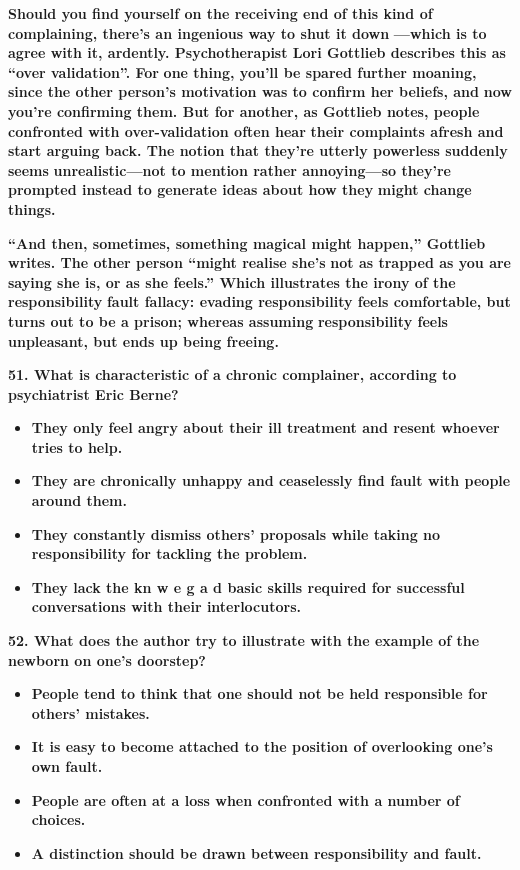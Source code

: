 \documentclass[UTF8,11pt]{ctexart}
\begin{document}
\textbf{Should you find yourself on the receiving end of this kind of complaining, there’s an ingenious way to shut it down} \textbf{—which is to agree with it, ardently. Psychotherapist Lori Gottlieb describes this as “over validation”. For} \textbf{one thing, you’ll be spared further moaning, since the other person’s motivation was to confirm her beliefs, and} \textbf{now you’re confirming them. But for another, as Gottlieb notes, people confronted with over-validation often hear} \textbf{their complaints afresh and start arguing back. The notion that they’re utterly powerless suddenly seems} \textbf{unrealistic—not to mention rather annoying—so they’re prompted instead to generate ideas about how they} \textbf{might change things.}


\textbf{“And then, sometimes, something magical might happen,” Gottlieb writes. The other person “might realise she’s} \textbf{not as trapped as you are saying she is, or as she feels.” Which illustrates the irony of the responsibility} \textbf{fault fallacy: evading responsibility feels comfortable, but turns out to be a prison; whereas assuming} \textbf{responsibility feels unpleasant, but ends up being freeing.}


\textbf{51. What is characteristic of a chronic complainer, according to psychiatrist Eric Berne?}


\begin{itemize}[leftmargin=2em,itemsep=.2em,topsep=.4em]\item[A.] \textbf{They only feel angry about their ill treatment and resent whoever tries to help.}
\item[B.] \textbf{They are chronically unhappy and ceaselessly find fault with people around them.}
\item[C.] \textbf{They constantly dismiss others’ proposals while taking no responsibility for tackling the problem.}
\item[D.] \textbf{They lack the kn w e g a d basic skills required for successful conversations with their interlocutors.}
\end{itemize}

\textbf{52. What does the author try to illustrate with the example of the newborn on one’s doorstep?}


\begin{itemize}[leftmargin=2em,itemsep=.2em,topsep=.4em]\item[A.] \textbf{People tend to think that one should not be held responsible for others’ mistakes.}
\item[B.] \textbf{It is easy to become attached to the position of overlooking one’s own fault.}
\item[C.] \textbf{People are often at a loss when confronted with a number of choices.}
\item[D.] \textbf{A distinction should be drawn between responsibility and fault.}
\end{itemize}
\end{document}
